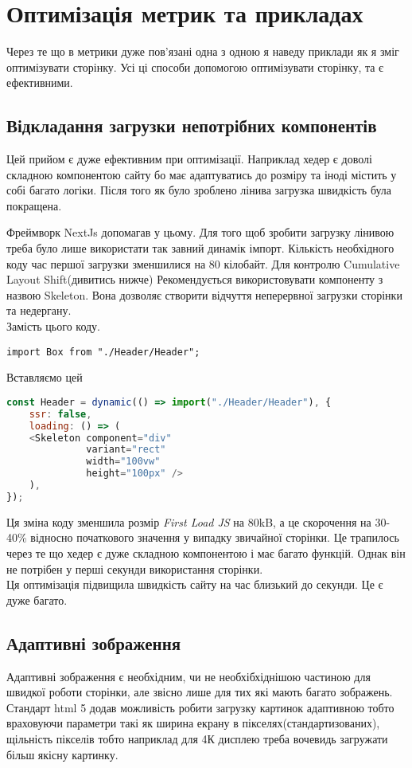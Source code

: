 \newpage
\section{Оптимізація метрик та прикладах}
Через те що в метрики дуже пов'язані одна з одною я наведу приклади як я зміг оптимізувати сторінку.
Усі ці способи допомогою оптимізувати сторінку, та є ефективними.
\subsection{Відкладання загрузки непотрібних компонентів}
Цей прийом є дуже ефективним при оптимізації. Наприклад хедер є доволі складною компонентою сайту бо має адаптуватись до розміру та іноді містить у собі багато логіки.
Після того як було зроблено лінива загрузка швидкість була покращена.

Фреймворк NextJs допомагав у цьому. Для того щоб зробити загрузку лінивою треба було лише використати так завний динамік імпорт.
Кількість необхідного коду час першої загрузки зменшилися на 80 кілобайт.
Для контролю Cumulative Layout Shift(дивитись нижче) Рекомендується використовувати компоненту з назвою Skeleton.
Вона дозволяє створити відчуття неперервної загрузки сторінки та недергану. \\
Замість цього коду.
\begin{lstlisting}[basicstyle=\small]
import Box from "./Header/Header";
\end{lstlisting}
Вставляємо цей
\begin{lstlisting}[basicstyle=\small, language=JavaScript]
const Header = dynamic(() => import("./Header/Header"), {
    ssr: false,
    loading: () => (
    <Skeleton component="div"
              variant="rect"
              width="100vw"
              height="100px" />
    ),
});
\end{lstlisting}
Ця зміна коду зменшила розмір \textit{First Load JS} на 80kB, а це скорочення на 30-40\% відносно початкового значення у випадку звичайної сторінки.
Це трапилось через те що хедер є дуже складною компонентою і має багато функцій.
Однак він не потрібен у перші секунди використання сторінки. \\
Ця оптимізація підвищила швидкість сайту на час близький до секунди. Це є дуже багато.
\subsection{Адаптивні зображення}
Адаптивні зображення є необхідним, чи не необхібхіднішою частиною для швидкої роботи сторінки, але звісно лише для тих які мають багато зображень.
Стандарт html 5 додав можливість робити загрузку картинок адаптивною тобто враховуючи параметри такі як ширина екрану в пікселях(стандартизованих),
щільність пікселів тобто наприклад для 4К дисплею треба вочевидь загружати більш якісну картинку.

